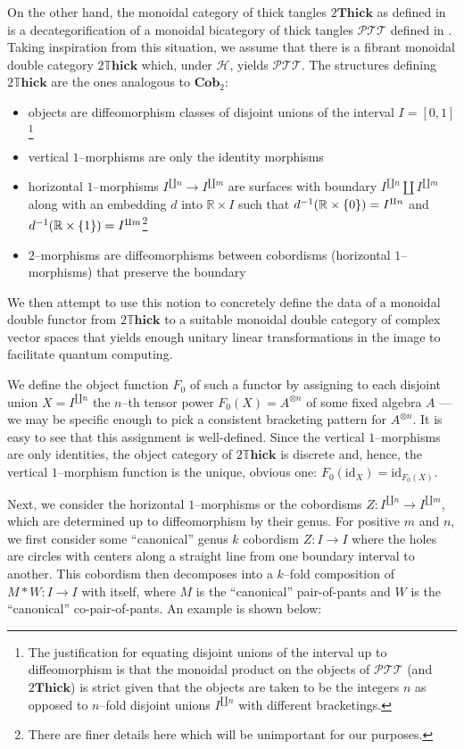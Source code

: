 \documentclass{amsart}
\newcommand{\R}{\mathbb{R}}
\newcommand{\tensor}{\otimes}
\renewcommand{\to}[1][]{\stackrel{#1}{\longrightarrow}}
\newcommand{\id}{\text{id}}
\newcommand{\curly}[1]{\left\{ #1 \right\}}
\newcommand{\set}[2][]{\ifthenelse{\equal{#1}{}}
                                  {\curly{#2}}
                                  {\curly{#1\ \textbf{:}\ #2}}}
\newcommand{\Cob}{\textbf{Cob}}
\newcommand{\Thick}{\textbf{Thick}}
\newcommand{\DThick}{2\mathbb{T}\mathbf{hick}}
\newcommand{\PTT}{\mathcal{PTT}}
\numberwithin{thm}{section}
\theoremstyle{definition}
\begin{document}
On the other hand, the monoidal category of thick tangles $2\Thick$ as defined
in \cite{NonCommTQFT} is a decategorification of a monoidal bicategory of thick
tangles $\PTT$ defined in \cite{NonSemiSimp}. Taking inspiration from this
situation, we assume that there is a fibrant monoidal double category
$\DThick$ which, under $\mathcal{H}$, yields $\PTT$. The structures defining
$\DThick$ are the ones analogous to $\Cob_{2}$:
\begin{itemize}
\setlength{\itemsep}{0pt}
\item objects are diffeomorphism classes of disjoint unions of the interval
$I = [0, 1]$\footnote{The justification for equating disjoint unions of the
interval up to diffeomorphism is that the monoidal product on the objects of
$\PTT$ (and $2\Thick$) is strict given that the objects are taken to be the
integers $n$ as opposed to $n$--fold disjoint unions $I^{\amalg n}$ with
different bracketings.}
\item vertical $1$--morphisms are only the identity morphisms
\item horizontal $1$--morphisms $I^{\amalg n} \to I^{\amalg m}$ are surfaces
with boundary $I^{\amalg n} \amalg I^{\amalg m}$ along with an embedding $d$
into $\R \times I$ such that $d^{-1}(\R \times \set{0}) = I^{\amalg n}$ and
$d^{-1}(\R \times \set{1}) = I^{\amalg m}$\footnote{There are finer details here
which will be unimportant for our purposes.}
\item $2$--morphisms are diffeomorphisms between cobordisms
(horizontal $1$--morphisms) that preserve the boundary
\end{itemize}
We then attempt to use this notion to concretely define the data of a monoidal
double functor from $\DThick$ to a suitable monoidal double category of complex
vector spaces that yields enough unitary linear transformations in the image to
facilitate quantum computing.

We define the object function $F_0$ of such a functor by assigning to each
disjoint union $X = I^{\amalg n}$ the $n$--th tensor power $F_0(X) = A^{\tensor
n}$ of some fixed algebra $A$ --- we may be specific enough to pick a consistent
bracketing pattern for $A^{\tensor n}$. It is easy to see that this assignment
is well-defined. Since the vertical $1$--morphisms are only identities, the
object category of $\DThick$ is discrete and, hence, the vertical $1$--morphism
function is the unique, obvious one: $F_0(\id_X) = \id_{F_0(X)}$.

Next, we consider the horizontal $1$--morphisms or the cobordisms
$Z : I^{\amalg n} \to I^{\amalg m}$, which are determined up to diffeomorphism
by their genus. For positive $m$ and $n$, we first consider some ``canonical''
genus $k$ cobordism $Z : I \to I$ where the holes are circles with centers along
a straight line from one boundary interval to another. This cobordism then
decomposes into a $k$--fold composition of $M * W : I \to I$ with itself, where
$M$ is the ``canonical'' pair-of-pants and $W$ is the ``canonical''
co-pair-of-pants. An example is shown below:
\end{document}
